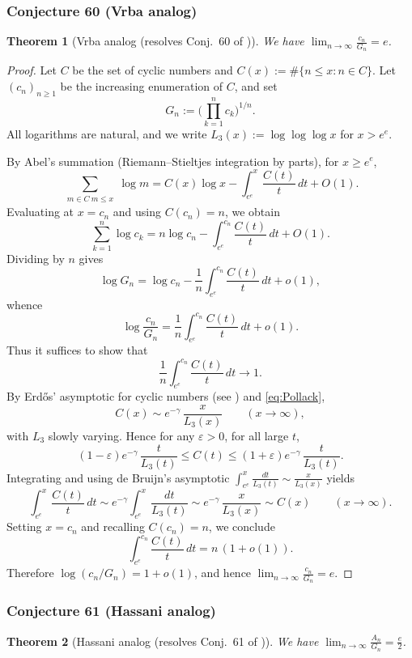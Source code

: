 \documentclass[12pt]{article}
\newtheorem{theorem}{Theorem}
\theoremstyle{remark}
\begin{document}


\subsubsection{Conjecture 60 (Vrba analog)}
\begin{theorem}[Vrba analog (resolves Conj.~60 of \cite{Cohen2025})]\label{thm:vrba}
We have $\displaystyle \lim_{n\to\infty} \frac{c_n}{G_n}=e$.
\end{theorem}

\begin{proof}
Let $C$ be the set of cyclic numbers and $C(x):=\#\{n\le x:n\in C\}$. Let $(c_n)_{n\ge1}$ be the increasing enumeration of $C$, and set
\[
 G_n:=\Big(\prod_{k=1}^n c_k\Big)^{1/n}.
\]
All logarithms are natural, and we write $L_3(x):=\log\log\log x$ for $x>e^e$.

By Abel's summation (Riemann--Stieltjes integration by parts), for $x\ge e^e$,
\[
 \sum_{\substack{m\in C\ m\le x}} \log m 
 = C(x)\log x - \int_{e^e}^x \frac{C(t)}{t}\,dt + O(1).
\]
Evaluating at $x=c_n$ and using $C(c_n)=n$, we obtain
\[
 \sum_{k=1}^n \log c_k 
 = n\log c_n - \int_{e^e}^{c_n} \frac{C(t)}{t}\,dt + O(1).
\]
Dividing by $n$ gives
\[
 \log G_n = \log c_n - \frac1n\int_{e^e}^{c_n} \frac{C(t)}{t}\,dt + o(1),
\]
whence
\[
 \log\frac{c_n}{G_n} = \frac1n\int_{e^e}^{c_n} \frac{C(t)}{t}\,dt + o(1).
\]
Thus it suffices to show that
\[
 \frac1n\int_{e^e}^{c_n} \frac{C(t)}{t}\,dt \to 1.
\]
By Erd\H{o}s' asymptotic for cyclic numbers (see \cite{Pollack2022}) and \eqref{eq:Pollack},
\[
 C(x) \sim e^{-\gamma}\,\frac{x}{L_3(x)} \qquad (x\to\infty),
\]
with $L_3$ slowly varying. Hence for any $\varepsilon>0$, for all large $t$,
\[
 (1-\varepsilon)e^{-\gamma}\,\frac{t}{L_3(t)} \le C(t) \le (1+\varepsilon)e^{-\gamma}\,\frac{t}{L_3(t)}.
\]
Integrating and using de Bruijn's asymptotic $\int_{e^e}^x \!\frac{dt}{L_3(t)}\sim \frac{x}{L_3(x)}$ \cite{deBruijn1970} yields
\[
 \int_{e^e}^x \frac{C(t)}{t}\,dt \sim e^{-\gamma}\int_{e^e}^x \frac{dt}{L_3(t)} \sim e^{-\gamma}\,\frac{x}{L_3(x)} \sim C(x) \qquad (x\to\infty).
\]
Setting $x=c_n$ and recalling $C(c_n)=n$, we conclude
\[
 \int_{e^e}^{c_n} \frac{C(t)}{t}\,dt = n\,(1+o(1)).
\]
Therefore $\log(c_n/G_n)=1+o(1)$, and hence $\displaystyle \lim_{n\to\infty} \frac{c_n}{G_n} = e$.
\end{proof}


\subsubsection{Conjecture 61 (Hassani analog)}
\begin{theorem}[Hassani analog (resolves Conj.~61 of \cite{Cohen2025})]\label{thm:hassani}
We have $\displaystyle \lim_{n\to\infty}\frac{A_n}{G_n}=\frac{e}{2}$.
\end{theorem}
\end{document}
